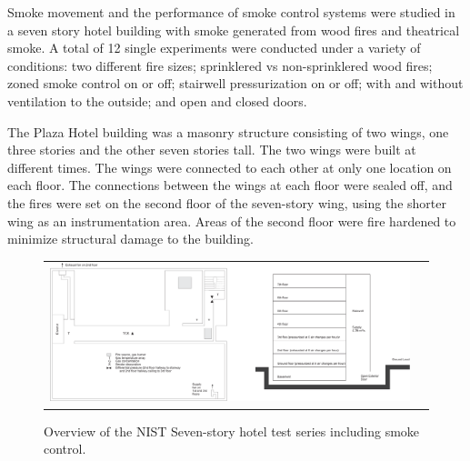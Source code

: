 Smoke movement and the performance of smoke control systems were studied in a seven story hotel building with smoke generated from wood fires and theatrical smoke. A total of 12 single experiments were conducted under a variety of conditions: two different fire sizes; sprinklered vs non-sprinklered wood fires; zoned smoke control on or off; stairwell pressurization on or off; with and without ventilation to the outside; and open and closed doors. 

The Plaza Hotel building was a masonry structure consisting of two wings, one three stories and the other seven stories tall. The two wings were built at different times. The wings were connected to each other at only one location on each floor. The connections between the wings at each floor were sealed off, and the fires were set on the second floor of the seven-story wing, using the shorter wing as an instrumentation area. Areas of the second floor were fire hardened to minimize structural damage to the building.

\begin{figure}[\figoptions{t}]
\begin{center}
\begin{tabular}{cc}
\includegraphics[width=6.0in]{FIGURES/NIST_PLAZA/PlazaSummary}\\
\end{tabular}
\end{center}
\caption{Overview of the NIST Seven-story hotel test series including smoke control.}
 \label{fig:PlazaSummary}
\end{figure}

